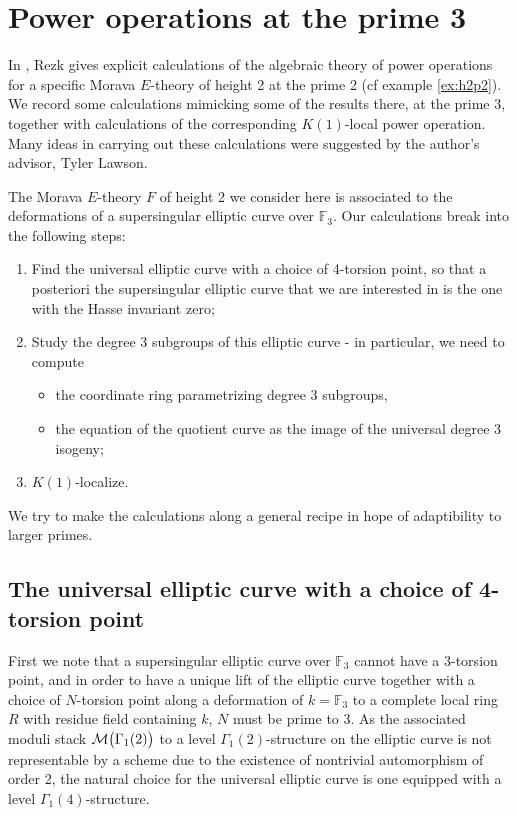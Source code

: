\documentclass{gtpart}
\theoremstyle{definition}
\theoremstyle{remark}
\newcommand{\mb}[1]{\mathbb{#1}}
\begin{document}
\section{Power operations at the prime 3}
\label{sec:p3}


In \cite{h2p2}, Rezk gives explicit calculations of the algebraic 
theory of power operations for a specific Morava $E$-theory of height 
2 at the prime 2 (cf example \ref{ex:h2p2}).  We record some 
calculations mimicking some of the results there, at the prime 3, 
together with calculations of the corresponding $K(1)$-local power 
operation.  Many ideas in carrying out 
these calculations were suggested by the author's advisor, Tyler Lawson.  

The Morava $E$-theory $F$ of height 2 we consider here is associated to the 
deformations of a supersingular elliptic curve over ${\mb F}_3$.  Our 
calculations break into the following steps:
\begin{enumerate}
\item Find the universal elliptic curve with a choice of 4-torsion 
point, so that a posteriori the supersingular elliptic curve that we are interested in 
is the one with the Hasse invariant zero; 
\item Study the degree 3 subgroups of this elliptic curve - in 
particular, we need to compute 
\begin{itemize}
 \item the coordinate ring parametrizing degree 3 subgroups,  
 \item the equation of the quotient curve as 
the image of the universal degree 3 isogeny;
\end{itemize} 
\item $K(1)$-localize.  
\end{enumerate}
We try to make the calculations along a general recipe in hope of adaptibility to larger primes.


\subsection{The universal elliptic curve with a choice of 4-torsion point}
\label{subsec:step1}

First we note that a supersingular elliptic curve over ${\mb F}_3$ 
cannot have a 3-torsion point, and in order to have a unique lift of 
the elliptic curve together with a choice of $N$-torsion point along 
a deformation of $k = {\mb F}_3$ to a complete local ring $R$ with 
residue field containing $k$, $N$ must be prime to 3.  As the 
associated moduli stack ${\cal M}\big(\Gamma_1(2)\big)$ to a level
$\Gamma_1(2)$-structure on the elliptic curve is not representable 
by a scheme due to the existence of nontrivial 
automorphism of order 2, the natural choice for the universal elliptic 
curve is one equipped with a level $\Gamma_1(4)$-structure.  
\end{document}

